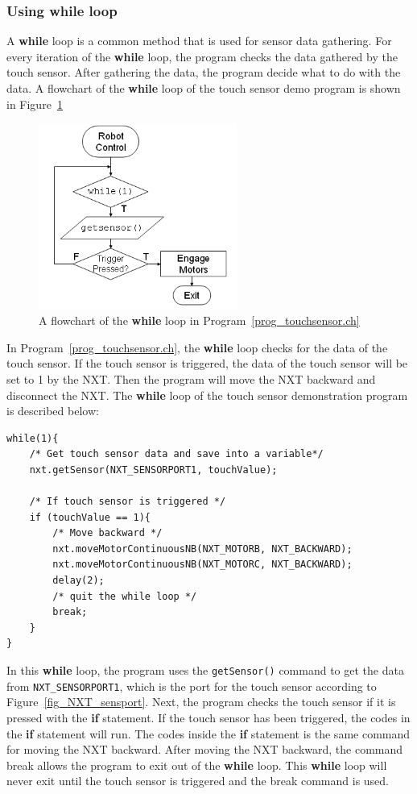 \documentclass[11pt]{article}
\begin{document}
\subsubsection*{Using while loop}
A {\bf while} loop is a common method that is used for sensor data gathering. 
For every iteration of the {\bf while} loop, the program checks the data 
gathered by the touch sensor. After gathering the data, the program decide what 
to do with the data. A flowchart of the {\bf while} loop of the touch sensor 
demo program is shown in Figure~\ref{fig_NXT_touchflow}\\
\begin{figure}[h]
  \begin{center}
    \includegraphics[height=2.4in]{figure/mindstorm/NXT_touchflow.png}
    \caption{A flowchart of the {\bf while} loop in Program~\ref{prog_touchsensor.ch}
    \label{fig_NXT_touchflow}}
  \end{center}
\end{figure}
In Program~\ref{prog_touchsensor.ch}, the {\bf while} loop checks for the data 
of the touch sensor. If the touch sensor is triggered, the data of the touch 
sensor will be set to 1 by the NXT. Then the program will move the NXT backward 
and disconnect the NXT. The {\bf while} loop of the touch sensor demonstration 
program is described below:
\begin{lstlisting}
while(1){
    /* Get touch sensor data and save into a variable*/
    nxt.getSensor(NXT_SENSORPORT1, touchValue);
    
    /* If touch sensor is triggered */
    if (touchValue == 1){
        /* Move backward */
        nxt.moveMotorContinuousNB(NXT_MOTORB, NXT_BACKWARD);
        nxt.moveMotorContinuousNB(NXT_MOTORC, NXT_BACKWARD);
        delay(2);
        /* quit the while loop */
        break;
    }
}
\end{lstlisting}
In this {\bf while} loop, the program uses the {\tt getSensor()} command to get 
the data from {\tt NXT\_SENSORPORT1}, which is the port for the touch sensor 
according to Figure~\ref{fig_NXT_sensport}. Next, the program checks the touch 
sensor if it is pressed with the {\bf if} statement. If the touch sensor has been 
triggered, the codes in the {\bf if} statement will run. The codes inside the 
{\bf if} statement is the same command for moving the NXT backward. After moving 
the NXT backward, the command break allows the program to exit out of the 
{\bf while} loop. This {\bf while} loop will never exit until the touch sensor 
is triggered and the break command is used.
\end{document}
